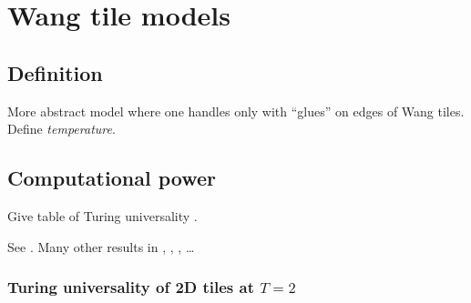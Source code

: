 \chapter{Wang tile models}   %

\section{Definition}
	
	More abstract model where one handles only with ``glues'' on edges of Wang tiles. Define {\em temperature}.

\section{Computational power}
	
	Give table of Turing universality \cite{cook_temp1}.
	
	See \cite{winfree_phd}. Many other results in \cite{cook_temp1}, \cite{stage_assembly}, \cite{square_lb}, \cite{square_ub} \ldots
	
	\subsection{Turing universality of 2D tiles at $T=2$}
		
